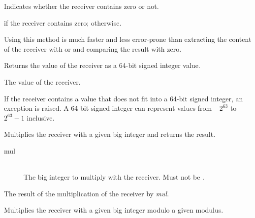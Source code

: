 
Indicates whether the receiver contains zero or not.


\docretval

 if the receiver contains zero;  otherwise.

\docdiscuss

Using this method is much faster and less error-prone than extracting the content of the receiver with  or  and comparing the result with zero.



Returns the value of the receiver as a 64-bit signed integer value.


\docretval

The value of the receiver.

\docdiscuss

If the receiver contains a value that does not fit into a 64-bit signed integer, an exception is raised. A 64-bit signed integer can represent values from $-2^{63}$ to $2^{63} - 1$ inclusive.



Multiplies the receiver with a given big integer and returns the result.


\docparams

\begin{description}
\item[mul] \hfill \\ The big integer to multiply with the receiver. Must not be .
\end{description}

\docretval

The result of the multiplication of the receiver by \emph{mul}.



Multiplies the receiver with a given big integer modulo a given modulus.

